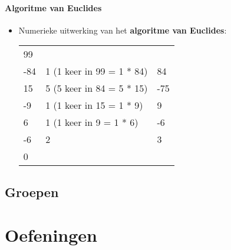 \documentclass[12pt]{report}
\newcommand{\important}[1] {\textbf{\color{orange}#1}}
\begin{document}
\subsection{Algoritme van Euclides}
\begin{itemize}
	\item Numerieke uitwerking van het \important{algoritme van Euclides}: \newline
	      	      
	      \begin{tabular}{l l l}
	      	99  &                            &     \\
	      	-84 & 1 (1 keer in 99 = 1 * 84)  & 84  \\
	      	15  & 5  (5 keer in 84 = 5 * 15) & -75 \\
	      	-9  & 1  (1 keer in 15 = 1 * 9)  & 9   \\
	      	6   & 1   (1 keer in 9 = 1 * 6)  & -6  \\
	      	-6  & 2                          & 3   \\
	      	0   &                            &     
	      \end{tabular}
	      	      
	      	      
\end{itemize}



\chapter{Groepen}
\label{ch:groepen}


\part{Oefeningen}
\end{document}
